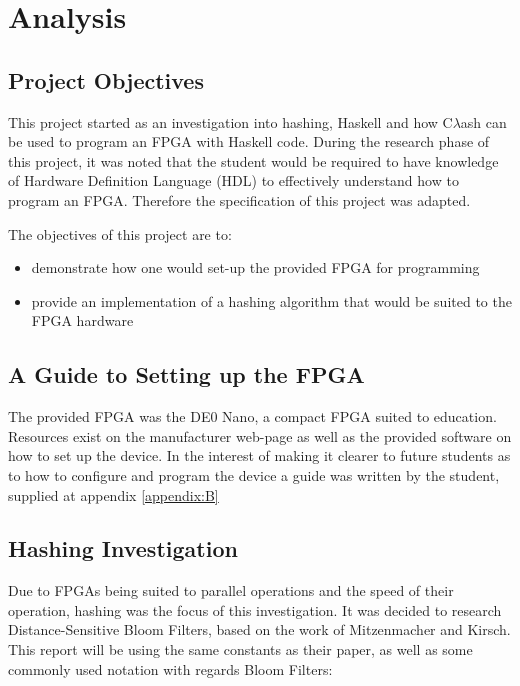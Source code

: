 \chapter{Analysis}
\section{Project Objectives}
This project started as an investigation into hashing, Haskell and how C$\lambda$ash can be used to program an FPGA with Haskell code. During the research phase of this project, it was noted that the student would be required to have knowledge of Hardware Definition Language (HDL) to effectively understand how to program an FPGA. Therefore the specification of this project was adapted.

The objectives of this project are to:
\begin{itemize}
	\item demonstrate how one would set-up the provided FPGA for programming
	\item provide an implementation of a hashing algorithm that would be suited to the FPGA hardware
\end{itemize}

\section{A Guide to Setting up the FPGA}
The provided FPGA was the DE0 Nano\cite{DE0NanoWebpage}, a compact FPGA suited to education. Resources exist on the manufacturer web-page as well as the provided software on how to set up the device. In the interest of making it clearer to future students as to how to configure and program the device a guide was written by the student, supplied at appendix \ref{appendix:B}

\section{Hashing Investigation}
Due to FPGAs being suited to parallel operations and the speed of their operation, hashing was the focus of this investigation. It was decided to research Distance-Sensitive Bloom Filters, based on the work of Mitzenmacher and Kirsch. \cite{DSBF} This report will be using the same constants as their paper, as well as some commonly used notation with regards Bloom Filters:

